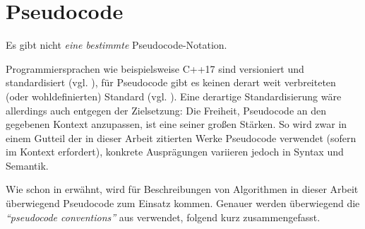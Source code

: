 \section{Pseudocode}
\label{sec:alg-spec-pseudo}

Es gibt nicht \emph{eine bestimmte} Pseudocode-Notation.

Programmiersprachen wie beispielsweise C++17 sind versioniert und standardisiert (vgl. \cite{ISO-C++17}), für Pseudocode gibt es keinen derart weit verbreiteten (oder wohldefinierten) Standard (vgl. \cite{kni1996}). Eine derartige Standardisierung wäre allerdings auch entgegen der Zielsetzung: Die Freiheit, Pseudocode an den gegebenen Kontext anzupassen, ist eine seiner großen Stärken. So wird zwar in einem Gutteil der in dieser Arbeit zitierten Werke Pseudocode verwendet (sofern im Kontext erfordert), konkrete Ausprägungen variieren jedoch in Syntax und Semantik\footnotemark.


Wie schon in  erwähnt, wird für Beschreibungen von Algorithmen in dieser Arbeit überwiegend Pseudocode zum Einsatz kommen. Genauer werden überwiegend die \emph{\enquote{pseudocode conventions}} aus \cite[20-22]{clrs2001} verwendet, folgend kurz zusammengefasst.

